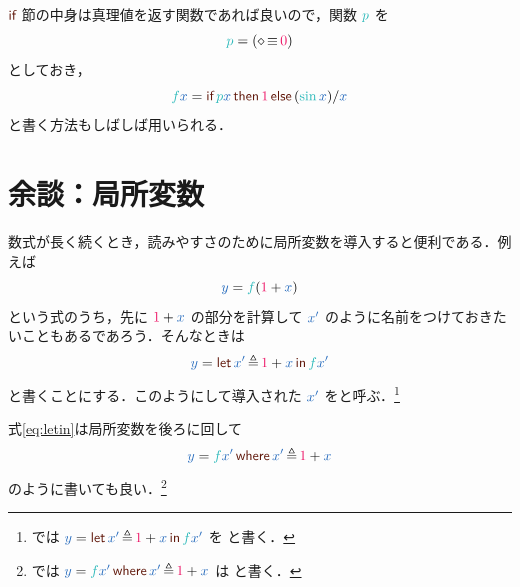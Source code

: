 \documentclass[a5paper,twoside,fleqn,draft]{jsbook}
\begin{document}
$\hIf$ 節の中身は真理値を返す関数であれば良いので，関数 $\hFunc{p}$ を
\begin{equation}
  \hFunc{p}
  =(\hAnonParam\hIfEq\hConstant{0})
\end{equation}
としておき，
\begin{equation}
  \hFunc{f}\hVar{x}
  =\hIfSyntax{\hFunc{p}\hVar{x}}{\hConstant{1}}{{}(\hSin\hVar{x})/\hVar{x}}
\end{equation}
と書く方法もしばしば用いられる．


\section{余談：局所変数}

数式が長く続くとき，読みやすさのために局所変数を導入すると便利である．例えば
\begin{equation}
  \hVar{y}
  =\hFunc{f}(\hConstant{1}+\hVar{x})
\end{equation}
という式のうち，先に $\hConstant{1}+\hVar{x}$ の部分を計算して $\hVar{x'}$ のように名前をつけておきたいこともあるであろう．そんなときは
\begin{equation}
  \label{eq:letin}
  \hVar{y}
  =\hLetSyntax{\hVar{x'}\hLetEq\hConstant{1}+\hVar{x}}{\hFunc{f}\hVar{x'}}
\end{equation}
と書くことにする．このようにして導入された $\hVar{x'}$ をと呼ぶ．\footnote{\haskell では $\hVar{y}=\hLetSyntax{\hVar{x'}\hLetEq\hConstant{1}+\hVar{x}}{\hFunc{f}\hVar{x'}}$ を  と書く．}

式\eqref{eq:letin}は局所変数を後ろに回して
\begin{equation}
  \label{eq:where}
  \hVar{y}
  =\hWhereSyntax{\hFunc{f}\hVar{x'}}{\hVar{x'}\hLetEq\hConstant{1}+\hVar{x}}
\end{equation}
のように書いても良い．\footnote{\haskell では $\hVar{y}=\hWhereSyntax{\hFunc{f}\hVar{x'}}{\hVar{x'}\hLetEq\hConstant{1}+\hVar{x}}$ は  と書く．}
\end{document}
